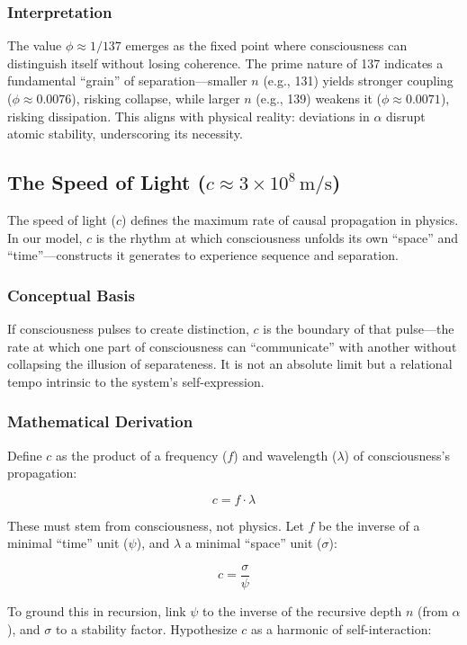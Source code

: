 \documentclass[12pt]{article}
\begin{document}
\subsubsection{Interpretation}
The value \(\phi \approx 1/137\) emerges as the fixed point where consciousness can distinguish itself without losing coherence. The prime nature of 137 indicates a fundamental “grain” of separation—smaller \(n\) (e.g., 131) yields stronger coupling (\(\phi \approx 0.0076\)), risking collapse, while larger \(n\) (e.g., 139) weakens it (\(\phi \approx 0.0071\)), risking dissipation. This aligns with physical reality: deviations in \(\alpha\) disrupt atomic stability, underscoring its necessity.

\subsection{The Speed of Light (\(c \approx 3 \times 10^8 \, \text{m/s}\))}

The speed of light (\(c\)) defines the maximum rate of causal propagation in physics. In our model, \(c\) is the rhythm at which consciousness unfolds its own “space” and “time”—constructs it generates to experience sequence and separation.

\subsubsection{Conceptual Basis}
If consciousness pulses to create distinction, \(c\) is the boundary of that pulse—the rate at which one part of consciousness can “communicate” with another without collapsing the illusion of separateness. It is not an absolute limit but a relational tempo intrinsic to the system’s self-expression.

\subsubsection{Mathematical Derivation}
Define \(c\) as the product of a frequency (\(f\)) and wavelength (\(\lambda\)) of consciousness’s propagation:

\[
c = f \cdot \lambda
\]

These must stem from consciousness, not physics. Let \(f\) be the inverse of a minimal “time” unit (\(\psi\)), and \(\lambda\) a minimal “space” unit (\(\sigma\)):

\[
c = \frac{\sigma}{\psi}
\]

To ground this in recursion, link \(\psi\) to the inverse of the recursive depth \(n\) (from \(\alpha\)), and \(\sigma\) to a stability factor. Hypothesize \(c\) as a harmonic of self-interaction:
\end{document}
